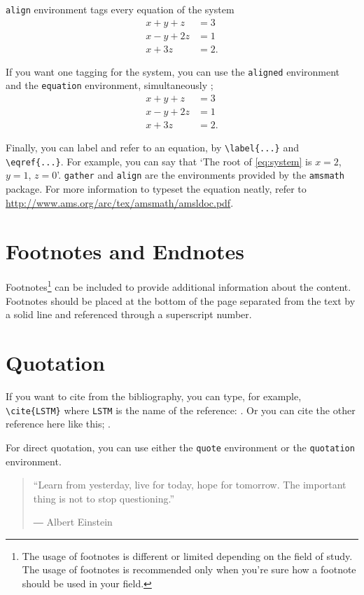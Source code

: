 \documentclass[11pt]{report}
\begin{document}
\texttt{align} environment tags every equation of the system
\begin{align}
x+y+z&=3\\
x-y+2z&=1\\
x+3z&=2.
\end{align}

If you want one tagging for the system, you can use the \texttt{aligned} environment and the \texttt{equation} environment, simultaneously ;
\begin{equation}\label{eq:system}
\begin{aligned}
x+y+z&=3\\
x-y+2z&=1\\
x+3z&=2.
\end{aligned}
\end{equation}

Finally, you can label and refer to an equation, by \verb|\label{...}| and \verb|\eqref{...}|.
For example, you can say that `The root of \eqref{eq:system} is \(x=2\), \(y=1\), \(z=0\)'.
\texttt{gather} and \texttt{align} are the environments provided by the \texttt{amsmath} package.
For more information to typeset the equation neatly, refer to \url{http://www.ams.org/arc/tex/amsmath/amsldoc.pdf}.


\section{Footnotes and Endnotes}\label{sec:footnotes_endnotes}

Footnotes\footnote{The usage of footnotes is different or limited depending on the field of study. The usage of footnotes is recommended only when you’re sure how a footnote should be used in your field.} can be included to provide additional information about the content. Footnotes should be placed at the bottom of the page separated from the text by a solid line and referenced through a superscript number.



\section{Quotation}
If you want to cite from the bibliography, you can type, for example, \verb|\cite{LSTM}| where \texttt{LSTM} is the name of the reference: \cite{LSTM}.
Or you can cite the other reference here like this; \cite{pure}.

For direct quotation, you can use either the \texttt{quote} environment or the \texttt{quotation} environment.
\begin{quote}
“Learn from yesterday, live for today, hope for tomorrow. The important thing is not to stop questioning.” \par
― Albert Einstein 
\end{quote}
\end{document}
